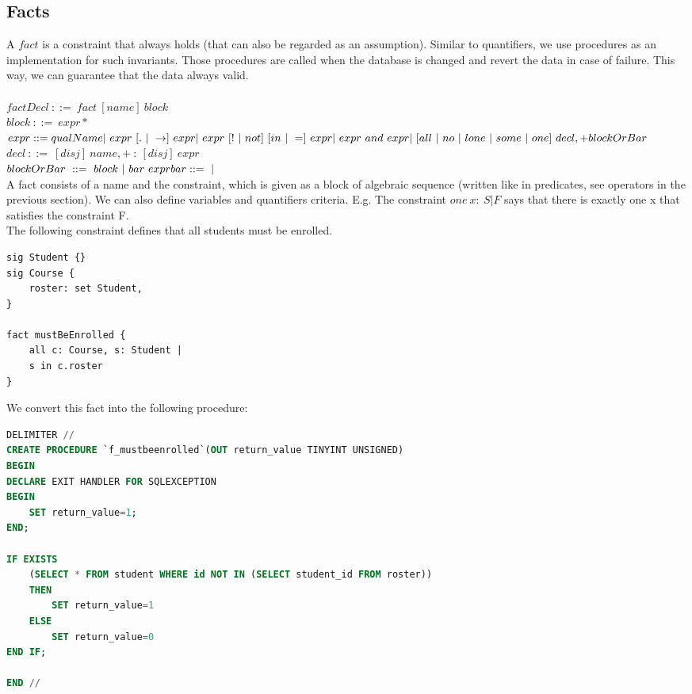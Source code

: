 \documentclass[oneside]{book}
\begin{document}
\subsection{Facts}
\label{sec:factsgen}
A $fact$ is a constraint that always holds (that can also be regarded as an assumption). Similar to quantifiers, we use procedures as an implementation for such invariants. Those procedures are called when the database is changed and revert the data in case of failure. This way, we can guarantee that the data always valid. \\\\
$factDecl\ ::=\ fact\ [name]\ block$\\
$block\ ::=\ { expr* }$\\
$expr ::= qualName\\
|\ expr\ [.\ |\ \rightarrow]\ expr \\
|\ expr\ [!\ |\ not]\ [in\ |\ =]\ expr\\
|\ expr\ and\ expr\\
|\ [all\ |\ no\ |\ lone\ |\ some\ |\ one]\ decl,+ blockOrBar$\\
$decl\ ::=\ [disj]\ name,+\ :\ [disj]\ expr$\\
$blockOrBar\ ::=\ block\ |\ bar\ expr\\
bar ::=\ |$\\

A fact consists of a name and the constraint, which is given as a block of algebraic sequence (written like in predicates, see operators in the previous section). We can also define variables and quantifiers criteria. E.g. The constraint $one\ x:\ S | F$ says that there is exactly one x that satisfies the constraint F.\\

The following constraint defines that all students must be enrolled.

\begin{lstlisting}
sig Student {}
sig Course {
	roster: set Student,
}

fact mustBeEnrolled {
	all c: Course, s: Student | 
	s in c.roster
}
\end{lstlisting}

We convert this fact into the following procedure:

\begin{lstlisting}[escapechar=@,language=SQL]
DELIMITER //
CREATE PROCEDURE `f_mustbeenrolled`(OUT return_value TINYINT UNSIGNED)
BEGIN
DECLARE EXIT HANDLER FOR SQLEXCEPTION
BEGIN
	SET return_value=1;
END;

IF EXISTS
	(SELECT * FROM student WHERE id NOT IN (SELECT student_id FROM roster))
	THEN
		SET return_value=1
	ELSE
		SET return_value=0
END IF;
	
END //
\end{lstlisting}
\end{document}
